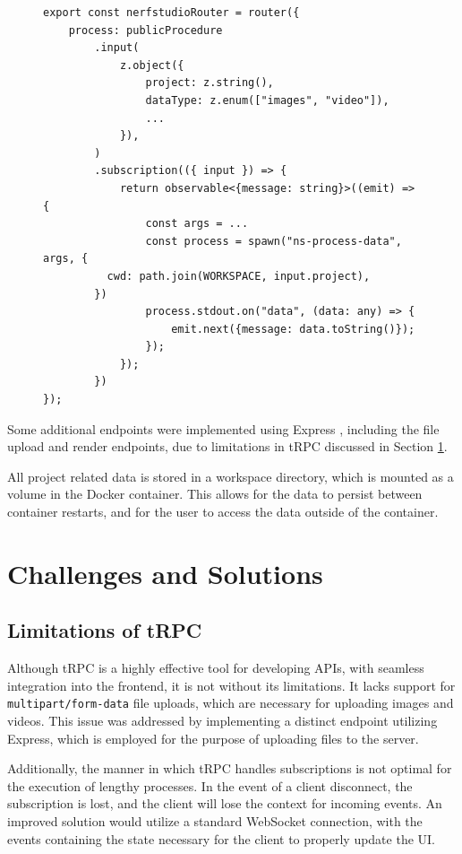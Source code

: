 \begin{figure}[htb]
\begin{lstlisting}[style=ES6, caption=Example tRPC endpoint for Pre-Processing returning a subscription., label=lst:trpc]
export const nerfstudioRouter = router({
	process: publicProcedure
		.input(
			z.object({
				project: z.string(),
				dataType: z.enum(["images", "video"]),
				...
			}),
		)
		.subscription(({ input }) => {
			return observable<{message: string}>((emit) => {
				const args = ...
				const process = spawn("ns-process-data", args, {
          cwd: path.join(WORKSPACE, input.project),
        })
				process.stdout.on("data", (data: any) => {
					emit.next({message: data.toString()});
				});
			});
		})
});
\end{lstlisting}
\end{figure}

Some additional endpoints were implemented using Express \cite{noauthor_express_nodate}, including the file upload and render endpoints, due to limitations in tRPC discussed in Section \ref{sec:system:challenges}.

All project related data is stored in a workspace directory, which is mounted as a volume in the Docker container.
This allows for the data to persist between container restarts, and for the user to access the data outside of the container.

\section{Challenges and Solutions}
\label{sec:system:challenges}

\subsection*{Limitations of tRPC}

Although tRPC is a highly effective tool for developing APIs, with seamless integration into the frontend, it is not without its limitations.
It lacks support for \texttt{multipart/form-data} file uploads, which are necessary for uploading images and videos.
This issue was addressed by implementing a distinct endpoint utilizing Express, which is employed for the purpose of uploading files to the server.

Additionally, the manner in which tRPC handles subscriptions is not optimal for the execution of lengthy processes.
In the event of a client disconnect, the subscription is lost, and the client will lose the context for incoming events.
An improved solution would utilize a standard WebSocket connection, with the events containing the state necessary for the client to properly update the UI.


